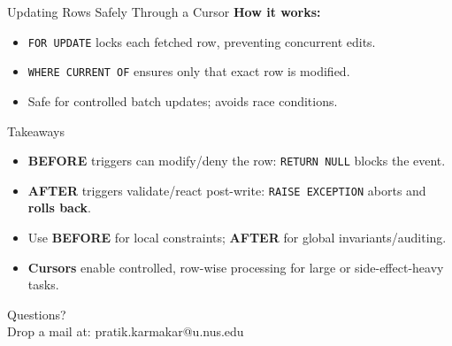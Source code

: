 \documentclass{beamer}
\begin{document}
\begin{frame}[fragile]{Updating Rows Safely Through a Cursor}
\textcolor{nus-blue}{\textbf{How it works:}}
\begin{itemize}
  \item \texttt{FOR UPDATE} locks each fetched row, preventing concurrent edits.
  \item \texttt{WHERE CURRENT OF} ensures only that exact row is modified.
  \item Safe for controlled batch updates; avoids race conditions.
\end{itemize}
\end{frame}

\begin{frame}{Takeaways}
\begin{itemize}
  \item \textbf{BEFORE} triggers can modify/deny the row: \texttt{RETURN NULL} blocks the event.
  \item \textbf{AFTER} triggers validate/react post-write: \texttt{RAISE EXCEPTION} aborts and \textbf{rolls back}.
  \item Use \textbf{BEFORE} for local constraints; \textbf{AFTER} for global invariants/auditing.
  \item \textbf{Cursors} enable controlled, row-wise processing for large or side-effect-heavy tasks.
\end{itemize}
\end{frame}

\begin{frame}
\begin{center}
Questions?\\
Drop a mail at: pratik.karmakar@u.nus.edu
\end{center}
\end{frame}
\end{document}
